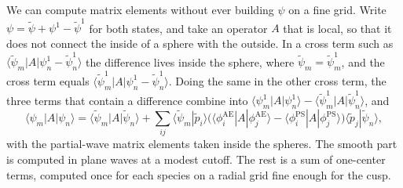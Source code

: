We can compute matrix elements without ever building $\psi$ on a fine grid. Write $\psi = \tilde\psi + \psi^1 - \tilde\psi^1$ for both states, and take an operator $A$ that is local, so that it does not connect the inside of a sphere with the outside. In a cross term such as $\langle\tilde\psi_m|A|\psi^1_n - \tilde\psi^1_n\rangle$ the difference lives inside the sphere, where $\tilde\psi_m = \tilde\psi^1_m$, and the cross term equals $\langle\tilde\psi^1_m|A|\psi^1_n - \tilde\psi^1_n\rangle$. Doing the same in the other cross term, the three terms that contain a difference combine into $\langle\psi^1_m|A|\psi^1_n\rangle - \langle\tilde\psi^1_m|A|\tilde\psi^1_n\rangle$, and
\begin{equation}
  \langle\psi_m|A|\psi_n\rangle = \langle\tilde\psi_m|A|\tilde\psi_n\rangle + \sum_{ij}\langle\tilde\psi_m|\tilde p_i\rangle\bigl(\langle\phi^{\mathrm{AE}}_i|A|\phi^{\mathrm{AE}}_j\rangle - \langle\phi^{\mathrm{PS}}_i|A|\phi^{\mathrm{PS}}_j\rangle\bigr)\langle\tilde p_j|\tilde\psi_n\rangle ,
  \label{eq:3.5-PAWop}
\end{equation}
with the partial-wave matrix elements taken inside the spheres. The smooth part is computed in plane waves at a modest cutoff. The rest is a sum of one-center terms, computed once for each species on a radial grid fine enough for the cusp.

